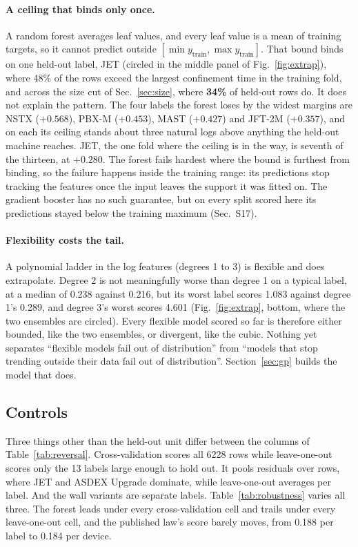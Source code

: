\documentclass[aip,pop,preprint,amsmath,amssymb]{revtex4-2}
\begin{document}
\paragraph{A ceiling that binds only once.} A random forest averages leaf
values, and every leaf value is a mean of training targets, so it cannot
predict outside $[\min y_{\text{train}}, \max y_{\text{train}}]$. That bound
binds on one held-out label, JET (circled in the middle panel of
Fig.~\ref{fig:extrap}), where 48\% of the rows exceed the largest confinement
time in the training fold, and across the size cut of
Sec.~\ref{sec:size}, where \textbf{34\%} of held-out rows do. It does not explain
the pattern. The four labels the forest loses by the widest margins are NSTX
($+0.568$), PBX-M ($+0.453$), MAST ($+0.427$) and JFT-2M ($+0.357$), and on each
its ceiling stands about three natural logs above anything the held-out machine
reaches. JET, the one fold where the ceiling is in the way, is seventh of the
thirteen, at $+0.280$. The forest fails hardest where the bound is furthest
from binding, so the failure happens inside the training range: its
predictions stop tracking the features once the input leaves the support it was
fitted on. The gradient booster has no such guarantee, but on every split scored
here its predictions stayed below the training maximum (Sec.~S17).

\paragraph{Flexibility costs the tail.} A polynomial ladder in the log features
(degrees 1 to 3) is flexible and does extrapolate. Degree 2 is not meaningfully
worse than degree 1 on a typical label, at a median of 0.238 against 0.216, but
its worst label scores 1.083 against degree 1's 0.289, and degree 3's worst
scores 4.601 (Fig.~\ref{fig:extrap}, bottom, where the two ensembles are
circled). Every flexible model scored so far is therefore either bounded,
like the two ensembles, or divergent, like the cubic. Nothing yet separates
``flexible models fail out of distribution'' from ``models that stop trending
outside their data fail out of distribution''. Section~\ref{sec:gp} builds the
model that does.

\subsection{Controls}
\label{sec:robustness}

Three things other than the held-out unit differ between the columns of
Table~\ref{tab:reversal}. Cross-validation scores all 6228 rows while
leave-one-out scores only the 13 labels large enough to hold out. It pools
residuals over rows, where JET and ASDEX Upgrade dominate, while leave-one-out
averages per label. And the wall variants are separate labels.
Table~\ref{tab:robustness} varies all three. The forest leads under every
cross-validation cell and trails under every leave-one-out cell, and the
published law's score barely moves, from 0.188 per label to 0.184 per device.
\end{document}
